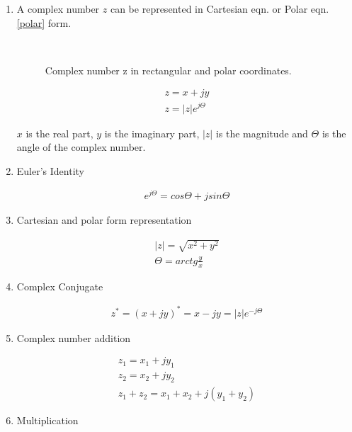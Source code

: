 \begin{enumerate}
\item A complex number $z$ can be represented in Cartesian eqn.  or Polar eqn. \ref{polar} form. 


\begin{figure}[htbp]
\begin{center}
\strut{} \\
\end{center}
\caption{Complex number z in rectangular and polar coordinates.}
\label{wind}
\end{figure}





\begin{eqnarray}
z= x + j y \label{chartesian} \\ \label{polar}
z=|z| e^{j \Theta} 
\end{eqnarray}


$x$ is the real part, $y$ is the imaginary part, $|z|$ is the magnitude and $\Theta$ is the angle of the complex number. 

\item Euler's Identity

\begin{eqnarray}
e^{j \Theta} = cos \Theta + j sin \Theta
\end{eqnarray}


\item Cartesian and polar form representation 

\begin{eqnarray}
|z|=\sqrt{x^2+y^2} \\
\Theta = arctg \frac{y}{x}
\end{eqnarray}


\item Complex Conjugate

\begin{eqnarray}
z^* = (x+ j y)^* = x- j y = |z| e^{-j \Theta}
\end{eqnarray}


\item Complex number addition

\begin{eqnarray}
z_1=x_1 + j y_1 \\
z_2=x_2 + j y_2 \\
z_1+z_2 = x_1 + x_2 + j ( y_1 + y_2)
\end{eqnarray}

\item Multiplication


\end{enumerate}
